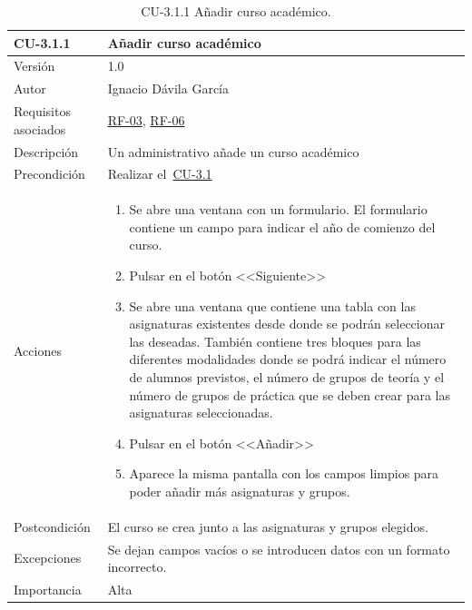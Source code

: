 \begin{table}[p]
	\centering
	\begin{tabularx}{\linewidth}{ p{} p{} }
		\toprule
		\textbf{CU-3.1.1}    & \textbf{Añadir curso académico}\\
		\toprule
		{\small Versión}              & 1.0    \\
		{\small Autor}                & Ignacio Dávila García \\
		{\small Requisitos asociados} & \hyperref[itm:RF3]{RF-03}, \hyperref[itm:RF6]{RF-06} \\
		{\small Descripción}          & Un administrativo añade un curso académico \\
		{\small Precondición}         & Realizar el~\hyperref[table:CU-3_1]{CU-3.1} \\
		{\small Acciones}             &
		\begin{enumerate}
			\def\labelenumi{\arabic{enumi}.}
			\tightlist
			\item Se abre una ventana con un formulario. El formulario contiene un campo para indicar el año de comienzo del curso.
			\item Pulsar en el botón <<Siguiente>>
			\item Se abre una ventana que contiene una tabla con las asignaturas existentes desde donde se podrán seleccionar las deseadas. También contiene tres bloques para las diferentes modalidades donde se podrá indicar el número de alumnos previstos, el número de grupos de teoría y el número de grupos de práctica que se deben crear para las asignaturas seleccionadas.
			\item Pulsar en el botón <<Añadir>>
			\item Aparece la misma pantalla con los campos limpios para poder añadir más asignaturas y grupos.
		\end{enumerate}\\
		{\small Postcondición}        & El curso se crea junto a las asignaturas y grupos elegidos. \\
		{\small Excepciones}          & Se dejan campos vacíos o se introducen datos con un formato incorrecto. \\
		{\small Importancia}          & Alta \\
		\bottomrule
	\end{tabularx}
	\caption{CU-3.1.1 Añadir curso académico.}\label{table:CU-3_1_1}
\end{table}
\FloatBarrier

